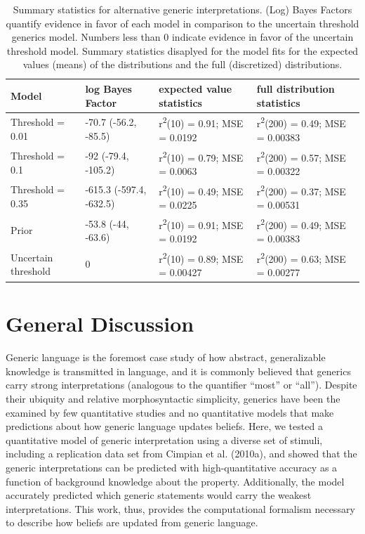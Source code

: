 \documentclass[,man,floatsintext]{apa6}
\theoremstyle{definition}
\theoremstyle{definition}
\theoremstyle{definition}
\theoremstyle{remark}
\begin{document}
\begin{table}[H]
\centering
\begingroup\fontsize{9pt}{10pt}\selectfont
\begin{tabular}{llll}
  \hline
Model & log Bayes Factor & expected value statistics & full distribution statistics \\ 
  \hline
Threshold = 0.01 & -70.7 (-56.2, -85.5) & r\textsuperscript{2}(10) = 0.91; MSE = 0.0192 & r\textsuperscript{2}(200) = 0.49; MSE = 0.00383 \\ 
  Threshold = 0.1 & -92 (-79.4, -105.2) & r\textsuperscript{2}(10) = 0.79; MSE = 0.0063 & r\textsuperscript{2}(200) = 0.57; MSE = 0.00322 \\ 
  Threshold = 0.35 & -615.3 (-597.4, -632.5) & r\textsuperscript{2}(10) = 0.49; MSE = 0.0225 & r\textsuperscript{2}(200) = 0.37; MSE = 0.00531 \\ 
  Prior & -53.8 (-44, -63.6) & r\textsuperscript{2}(10) = 0.91; MSE = 0.0192 & r\textsuperscript{2}(200) = 0.49; MSE = 0.00383 \\ 
  Uncertain threshold & 0 & r\textsuperscript{2}(10) = 0.89; MSE = 0.00427 & r\textsuperscript{2}(200) = 0.63; MSE = 0.00277 \\ 
   \hline
\end{tabular}
\endgroup
\caption{Summary statistics for alternative generic interpretations. (Log) Bayes Factors quantify evidence in favor of each model in comparison to the uncertain threshold generics model. Numbers less than 0 indicate evidence in favor of the uncertain threshold model. Summary statistics disaplyed for the model fits for the expected values (means) of the distributions and the full (discretized) distributions.} 
\end{table}

\hypertarget{general-discussion}{%
\section{General Discussion}\label{general-discussion}}

Generic language is the foremost case study of how abstract,
generalizable knowledge is transmitted in language, and it is commonly
believed that generics carry strong interpretations (analogous to the
quantifier \enquote{most} or \enquote{all}). Despite their ubiquity and
relative morphosyntactic simplicity, generics have been the examined by
few quantitative studies and no quantitative models that make
predictions about how generic language updates beliefs. Here, we tested
a quantitative model of generic interpretation using a diverse set of
stimuli, including a replication data set from Cimpian et al. (2010a),
and showed that the generic interpretations can be predicted with
high-quantitative accuracy as a function of background knowledge about
the property. Additionally, the model accurately predicted which generic
statements would carry the weakest interpretations. This work, thus,
provides the computational formalism necessary to describe how beliefs
are updated from generic language.
\end{document}
